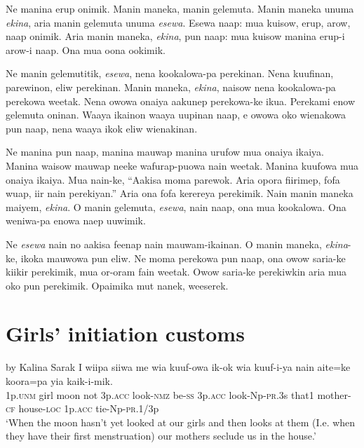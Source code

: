 Ne manina erup onimik. 
Manin maneka, manin gelemuta. 
\textrm{Manin maneka unuma }\textrm{\textit{ekina}}\textrm{,  aria manin gelemuta unuma }\textrm{\textit{esewa}}\textrm{. }
\textrm{Esewa naap:  mua kuisow, erup, arow, naap onimik. }
\textrm{Aria manin maneka, }\textrm{\textit{ekina}}\textrm{, pun naap:  mua kuisow manina erup-i arow-i naap. }
Ona mua oona ookimik. 

\textrm{Ne manin gelemutitik, }\textrm{\textit{esewa}}\textrm{, nena kookalowa-pa perekinan. }
Nena kuufinan,  parewinon,  eliw perekinan. 
\textrm{Manin maneka, }\textrm{\textit{ekina}}\textrm{, naisow nena kookalowa-pa perekowa weetak. }
\textrm{Nena owowa onaiya aakunep perekowa-ke ikua. }
Perekami  enow gelemuta oninan. 
\textrm{Waaya ikainon waaya uupinan naap,  e owowa oko wienakowa pun naap,  nena waaya ikok  eliw wienakinan. }

\textrm{Ne manina pun naap,  manina mauwap manina urufow mua onaiya ikaiya. }
Manina waisow mauwap neeke wafurap-puowa nain weetak. 
Manina kuufowa mua onaiya ikaiya. 
Mua nain-ke,  “Aakisa moma parewok. 
\textrm{Aria opora fiirimep,  fofa wuap,  iir nain perekiyan.” }
Aria ona fofa kerereya  perekimik. 
\textrm{Nain manin maneka maiyem, }\textrm{\textit{ekina}}\textrm{. }
\textrm{O manin gelemuta, }\textrm{\textit{esewa}}\textrm{, nain naap,  ona mua kookalowa. }
Ona weniwa-pa enowa naep uuwimik. 

\textrm{Ne }\textrm{\textit{esewa}}\textrm{ nain no aakisa feenap nain mauwam-ikainan. }
\textrm{O manin maneka, }\textrm{\textit{ekina}}\textrm{{}-ke, ikoka mauwowa pun eliw. }
Ne moma perekowa pun naap,  ona owow saria-ke kiikir perekimik,  mua or-oram fain weetak. 
Owow saria-ke perekiwkin  aria mua oko pun perekimik. 
Opaimika mut nanek, weeserek. 


\section{Girls’ initiation customs}\label{app:2:girls}
by Kalina Sarak
\ea
\gll  I  wiipa  siiwa  me  wia  kuuf-owa  ik-ok  wia  kuuf-i-ya          nain  aite=ke  koora=pa  yia  kaik-i-mik. \\
1p.\textsc{unm}  girl  moon  not  3p.\textsc{acc}  look-\textsc{nmz}  be-\textsc{ss}  3p.\textsc{acc}  look-Np-\textsc{pr}.3s  that1  mother-\textsc{cf}  house-\textsc{loc}  1p.\textsc{acc}  tie-Np-\textsc{pr}.1/3p \\


\glt ‘When the moon hasn’t yet looked at our girls and then looks at them (I.e. when they have their first menstruation) our mothers seclude us in the house.’ \\
\z


